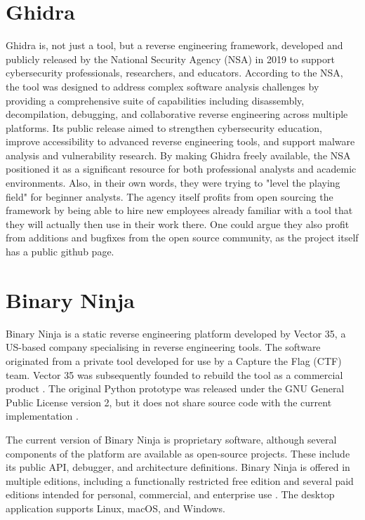 \section{Ghidra}
\label{sec:tools:ghidra}
Ghidra is, not just a tool, but a reverse engineering framework, developed and publicly released by the National Security Agency (NSA) in 2019 to support 
cybersecurity professionals, researchers, and educators. According to the NSA, the tool was designed to address complex software analysis challenges by providing a 
comprehensive suite of capabilities including disassembly, decompilation, debugging, and collaborative reverse engineering across multiple platforms. 
Its public release aimed to strengthen cybersecurity education, improve accessibility to advanced reverse engineering tools, and support malware analysis and vulnerability research. 
By making Ghidra freely available, the NSA positioned it as a significant resource for both professional analysts and academic environments.
Also, in their own words, they were trying to "level the playing field" for beginner analysts. The agency itself profits from open sourcing the framework by being able 
to hire new employees already familiar with a tool that they will actually then use in their work there. One could argue they also profit from additions and bugfixes from 
the open source community, as the project itself has a public github page.
\cite{bib:nsa-ghidra-release}

\section{Binary Ninja}
\label{sec:tools:binaryninja}
Binary Ninja is a static reverse engineering platform developed by Vector 35, a US-based company specialising in reverse engineering tools. 
The software originated from a private tool developed for use by a Capture the Flag (CTF) team. Vector 35 was subsequently founded to rebuild the tool as a commercial product 
\cite{bib:binaryninja_faq}. The original Python prototype was released under the GNU General Public License version 2, but it does not share source code with the current implementation 
\cite{bib:binaryninja_faq}.

The current version of Binary Ninja is proprietary software, although several components of the platform are available as open-source projects. These include its public API, 
debugger, and architecture definitions. Binary Ninja is offered in multiple editions, including a functionally restricted free edition and several paid editions intended for personal, 
commercial, and enterprise use \cite{bib:binaryninja_faq}. The desktop application supports Linux, macOS, and Windows.


